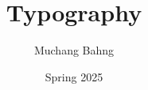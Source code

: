\documentclass{article}
\begin{document}
\title{Typography}
\author{Muchang Bahng}
\date{Spring 2025}

\maketitle
\tableofcontents
\pagebreak





\end{document}
